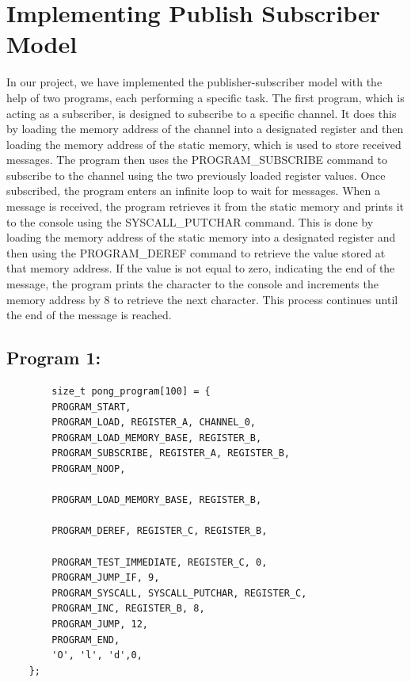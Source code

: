 \documentclass[12pt]{report}
\begin{document}
    \chapter{Implementing Publish Subscriber Model}
    In our project, we have implemented the publisher-subscriber model with the help of two programs,
    each performing a specific task. The first program, which is acting as a subscriber,
    is designed to subscribe to a specific channel. It does this by loading the memory address of the channel 
    into a designated register and then loading the memory address of the static memory, which is used to store received messages.  
    The program then uses the PROGRAM\_SUBSCRIBE command to subscribe to the channel using the two previously loaded register values. 
    Once subscribed, the program enters an infinite loop to wait for messages. 
    When a message is received, the program retrieves it from the static memory and prints it to the console using the SYSCALL\_PUTCHAR
    command. This is done by loading the memory address of the static memory into a designated register and then using the PROGRAM\_DEREF
    command to retrieve the value stored at that memory address. If the value is not equal to zero, indicating the end of the message,
    the program prints the character to the console and increments the memory address by 8 to retrieve the next character. 
    This process continues until the end of the message is reached. 

	\pagebreak
    \section{Program 1:}
    \begin{verbatim}
        size_t pong_program[100] = { 
        PROGRAM_START, 
        PROGRAM_LOAD, REGISTER_A, CHANNEL_0,
        PROGRAM_LOAD_MEMORY_BASE, REGISTER_B, 
        PROGRAM_SUBSCRIBE, REGISTER_A, REGISTER_B, 
        PROGRAM_NOOP,

        PROGRAM_LOAD_MEMORY_BASE, REGISTER_B, 

        PROGRAM_DEREF, REGISTER_C, REGISTER_B, 

        PROGRAM_TEST_IMMEDIATE, REGISTER_C, 0, 
        PROGRAM_JUMP_IF, 9,                     
        PROGRAM_SYSCALL, SYSCALL_PUTCHAR, REGISTER_C, 
        PROGRAM_INC, REGISTER_B, 8, 
        PROGRAM_JUMP, 12, 
        PROGRAM_END, 
        'O', 'l', 'd',0, 
    }; 
    \end{verbatim}

\end{document}
